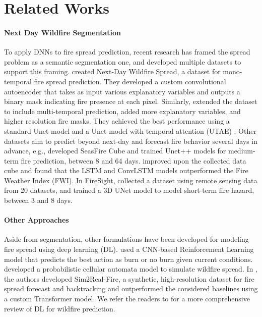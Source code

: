 
\section{Related Works}
\label{sec:related_works}
\paragraph{Next Day Wildfire Segmentation} To apply DNNs to fire spread prediction, recent research has framed the spread problem as a semantic segmentation one, and developed multiple datasets to support this framing. \cite{huot2022next} created Next-Day Wildfire Spread, a dataset for mono-temporal fire spread prediction. They developed a custom convolutional autoencoder that takes as input various explanatory variables and outputs a binary mask indicating fire presence at each pixel. Similarly, \cite{gerard2023wildfirespreadts} extended the dataset to include multi-temporal prediction, added more explanatory variables, and higher resolution fire masks. They achieved the best performance using a standard Unet model and a Unet model with temporal attention (UTAE) \cite{garnot2021panoptic}. Other datasets aim to predict beyond next-day and forecast fire behavior several days in advance, e.g., \cite{prapas2022deep} developed SeasFire Cube and trained Unet++ models \cite{zhou2018unet++} for medium-term fire prediction, between 8 and 64 days. \cite{kondylatos2022wildfire} improved upon the collected data cube and found that the LSTM and ConvLSTM models outperformed the Fire Weather Index (FWI). In FireSight, \cite{gottfriedsenfiresight} collected a dataset using remote sensing data from 20 datasets, and trained a 3D UNet model to model short-term fire hazard, between 3 and 8 days.  

\paragraph{Other Approaches}  Aside from segmentation, other formulations have been developed for modeling fire spread using deep learning (DL). \cite{ross2021being} used a CNN-based Reinforcement Learning model that predicts the best action as burn or no burn given current conditions. \cite{ghosh2024fire} developed a probabilistic cellular automata model to simulate wildfire spread. In \cite{lisim2real}, the authors developed Sim2Real-Fire, a synthetic, high-resolution dataset for fire spread forecast and backtracking and outperformed the considered baselines using a custom Transformer model. We refer the readers to \cite{xu2024wildfire} for a more comprehensive review of DL for wildfire prediction. 

